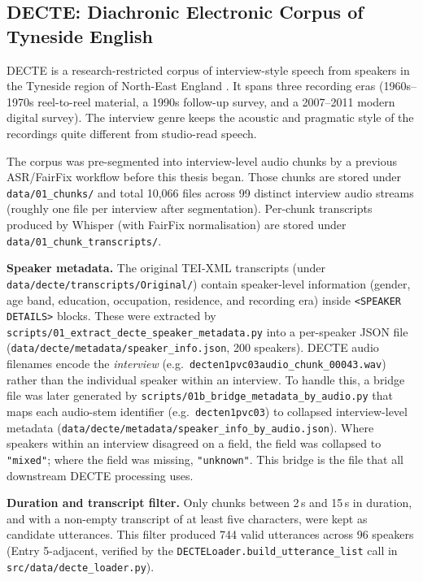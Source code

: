 \subsection{DECTE: Diachronic Electronic Corpus of Tyneside English}
\label{sec:methodology-corpora-decte}

DECTE is a research-restricted corpus of interview-style speech from
speakers in the Tyneside region of North-East England
\cite{Corrigan_DECTE}. It spans three recording eras (1960s--1970s
reel-to-reel material, a 1990s follow-up survey, and a 2007--2011
modern digital survey). The interview genre keeps the acoustic and
pragmatic style of the recordings quite different from studio-read
speech.

The corpus was pre-segmented into interview-level audio chunks by a
previous ASR/FairFix workflow before this thesis began. Those chunks
are stored under \texttt{data/01\_chunks/} and total 10,066 files
across 99 distinct interview audio streams (roughly one file per
interview after segmentation). Per-chunk transcripts produced by
Whisper (with FairFix normalisation) are stored under
\texttt{data/01\_chunk\_transcripts/}.

\textbf{Speaker metadata.} The original TEI-XML transcripts (under
\texttt{data/decte/}\allowbreak\texttt{transcripts/Original/}) contain
speaker-level information (gender, age band, education, occupation,
residence, and recording era) inside \texttt{<SPEAKER DETAILS>}
blocks. These were extracted by
\texttt{scripts/}\allowbreak\texttt{01\_extract\_decte\_}\allowbreak\texttt{speaker\_metadata.py}
into a per-speaker JSON file
(\texttt{data/decte/metadata/}\allowbreak\texttt{speaker\_info.json},
200 speakers). DECTE audio filenames encode the \emph{interview}
(e.g.\ \texttt{decten1pvc03audio\_}\allowbreak\texttt{chunk\_00043.wav})
rather than the individual speaker within an interview. To handle
this, a bridge file was later generated by
\texttt{scripts/}\allowbreak\texttt{01b\_bridge\_metadata\_}\allowbreak\texttt{by\_audio.py}
that maps each audio-stem identifier (e.g.\ \texttt{decten1pvc03})
to collapsed interview-level metadata
(\texttt{data/decte/metadata/}\allowbreak\texttt{speaker\_info\_by\_audio.json}).
Where speakers within an interview disagreed on a field, the field
was collapsed to \texttt{"mixed"}; where the field was missing,
\texttt{"unknown"}. This bridge is the file that all downstream DECTE
processing uses.

\textbf{Duration and transcript filter.} Only chunks between 2\,s and
15\,s in duration, and with a non-empty transcript of at least five
characters, were kept as candidate utterances. This filter produced
744 valid utterances across 96 speakers (Entry 5-adjacent, verified
by the \texttt{DECTELoader.build\_utterance\_list} call in
\texttt{src/data/decte\_loader.py}).

